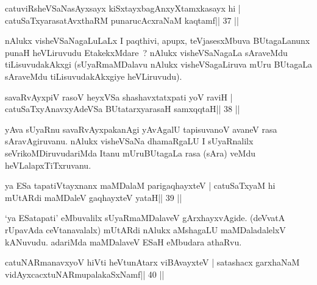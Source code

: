 

\begin{shl}
\footnotemark[1]catuviRsheVSaNasAyxsayx kiSxtayxbagAnxyXtamxkasayx hi |
\footnotemark[1]catuSaTxyarasatAvxthaRM punarucAcxraNaM kaqtamf\hfill || 37 ||
\end{shl}

\begin{artha}
nAlukx visheVSaNagaLuLaLx I paqthivi, apupx, teVjasesxMbuva BUtagaLanunx punaH heVLiruvudu EtakekxMdare~? nAlukx visheVSaNagaLa sAraveMdu tiLisuvudakAkxgi  (sUyaRmaMDalavu nAlukx visheVSagaLiruva mUru BUtagaLa sAraveMdu tiLisuvudakAkxgiye heVLiruvudu).
\end{artha}



\begin{shl}
savaRvAyxpiV rasoV heyxVSa shashavxtatxpati yoV raviH |
\footnotemark[1]catuSaTxyAnavxyAdeVSa BUtatarxyarasaH samxqqtaH\hfill || 38 ||
\end{shl}

\begin{artha}
yAva sUyaRnu savaRvAyxpakanAgi yAvAgalU tapisuvanoV avaneV rasa sAravAgiruvanu. nAlukx visheVSaNa dhamaRgaLU I sUyaRnalilx seVrikoMDiruvudariMda Itanu mUruBUtagaLa rasa (sAra) veMdu heVLalapxTiTxruvanu.
\end{artha}



\begin{shl}
ya ESa tapatiVtayxnanx maMDalaM parigaqhayxteV |
catuSaTxyaM hi mUtARdi maMDaleV gaqhayxteV yataH\hfill || 39 ||
\end{shl}

\begin{artha}
`ya ESatapati' eMbuvalilx sUyaRmaMDalaveV gArxhayxvAgide. (deVvatA rUpavAda ceVtanavalalx) mUtARdi nAlukx aMshagaLU maMDaladalelxV kANuvudu. adariMda maMDalaveV ESaH eMbudara athaRvu.
\end{artha}



\begin{shl}
catuNARmanavxyoV hiVti heVtunA\s tarx viBAvayxteV |
satashacx garxhaNaM vidAyxcacxtuNARmupalakaSxNamf\hfill || 40 ||
\end{shl}

